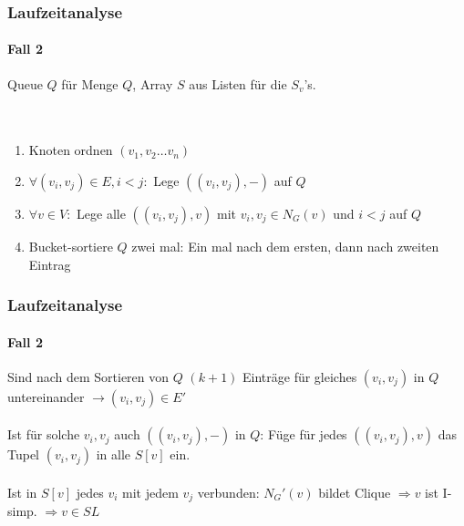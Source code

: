 \begin{frame}
\frametitle{Laufzeitanalyse}
\framesubtitle{Fall 2}

Queue $Q$ für Menge $Q$, Array $S$ aus Listen für die $S_v$'s. \\
\ \\
\ \\

\begin{enumerate}
	\item Knoten ordnen $(v_1, v_2 \dots v_n)$
	\item $\forall (v_i, v_j) \in E, i < j:$ Lege $((v_i, v_j), -)$ auf $Q$
	\item $\forall v \in V:$ Lege alle $((v_i, v_j), v)$ mit $v_i, v_j \in N_G(v)$ und $i < j$ auf $Q$
	\item Bucket-sortiere $Q$ zwei mal: Ein mal nach dem ersten, dann nach zweiten Eintrag
\end{enumerate}


\end{frame}


\begin{frame}
\frametitle{Laufzeitanalyse}
\framesubtitle{Fall 2}

Sind nach dem Sortieren von $Q$ $(k+1)$ Einträge für gleiches $(v_i, v_j)$ in $Q$ untereinander $\rightarrow (v_i, v_j) \in E'$ \\
\ \\
Ist für solche $v_i, v_j$ auch $((v_i, v_j), -)$ in $Q$: Füge für jedes $((v_i, v_j), v)$ das Tupel $(v_i, v_j)$ in alle $S[v]$ ein.\\
\ \\
Ist in $S[v]$ jedes $v_i$ mit jedem $v_j$ verbunden: $N_G'(v)$ bildet Clique $\Rightarrow v$ ist I-simp. $\Rightarrow v \in SL$
\end{frame}



